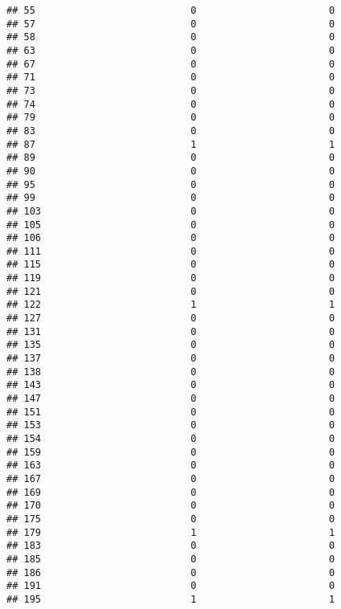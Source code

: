 \documentclass[
]{article}
\begin{document}
\begin{verbatim}
## 55                           0                       0
## 57                           0                       0
## 58                           0                       0
## 63                           0                       0
## 67                           0                       0
## 71                           0                       0
## 73                           0                       0
## 74                           0                       0
## 79                           0                       0
## 83                           0                       0
## 87                           1                       1
## 89                           0                       0
## 90                           0                       0
## 95                           0                       0
## 99                           0                       0
## 103                          0                       0
## 105                          0                       0
## 106                          0                       0
## 111                          0                       0
## 115                          0                       0
## 119                          0                       0
## 121                          0                       0
## 122                          1                       1
## 127                          0                       0
## 131                          0                       0
## 135                          0                       0
## 137                          0                       0
## 138                          0                       0
## 143                          0                       0
## 147                          0                       0
## 151                          0                       0
## 153                          0                       0
## 154                          0                       0
## 159                          0                       0
## 163                          0                       0
## 167                          0                       0
## 169                          0                       0
## 170                          0                       0
## 175                          0                       0
## 179                          1                       1
## 183                          0                       0
## 185                          0                       0
## 186                          0                       0
## 191                          0                       0
## 195                          1                       1

\end{verbatim}
\end{document}
